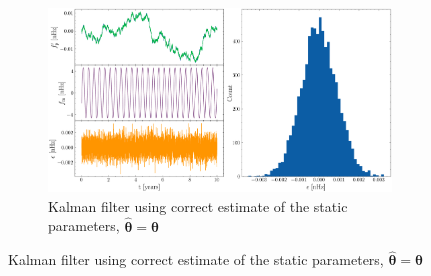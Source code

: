 \documentclass[fleqn,usenatbib,useAMS]{mnras}
\begin{document}
\begin{figure}
	\begin{subfigure}[b]{1\textwidth}
		\includegraphics[width=\textwidth]{images/Kalman_example_true_params}
		\caption{Kalman filter using correct estimate of the static parameters, $\hat{\boldsymbol{\theta}} = \boldsymbol{\theta}$ }
		\label{fig:6MB_BFS}
	\end{subfigure} \newline 


\end{figure}
\end{document}
